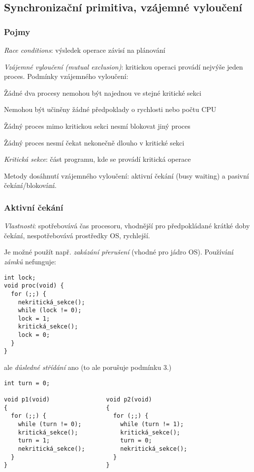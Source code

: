 \subsection{Synchronizační primitiva, vzájemné vyloučení}

\subsubsection*{Pojmy}

\emph{Race conditions}: výsledek operace závisí na plánování

\emph{Vzájemné vyloučení (mutual exclusion)}: kritickou operaci provádí nejvýše jeden proces. Podmínky vzájemného vyloučení:
\begin{penumerate}
	\item Žádné dva procesy nemohou být najednou ve stejné kritické sekci
	\item Nemohou být učiněny žádné předpoklady o rychlosti nebo počtu CPU
	\item Žádný proces mimo kritickou sekci nesmí blokovat jiný proces
	\item Žádný proces nesmí čekat nekonečně dlouho v kritické sekci
\end{penumerate}

\emph{Kritická sekce}: část programu, kde se provádí kritická operace

Metody dosáhnutí vzájemného vyloučení: aktivní čekání (busy waiting) a pasivní čekání/blokování.

\subsubsection*{Aktivní čekání}
\emph{Vlastnosti}: spotřebovává čas procesoru, vhodnější pro předpokládané krátké doby čekání, nespotřebovává prostředky OS, rychlejší.

Je možné použít např. \emph{zakázání přerušení} (vhodné pro jádro OS). Používání \emph{zámků} nefunguje:
\begin{verbatim}
int lock;
void proc(void) {
  for (;;) {
    nekritická_sekce();
    while (lock != 0);
    lock = 1;
    kritická_sekce();
    lock = 0;
  }
}
\end{verbatim}
ale \emph{důsledné střídání} ano (to ale porušuje podmínku 3.)

\begin{verbatim}
int turn = 0;

void p1(void)                void p2(void)
{                            {
  for (;;) {                   for (;;) {
    while (turn != 0);           while (turn != 1);
    kritická_sekce();            kritická_sekce();
    turn = 1;                    turn = 0;
    nekritická_sekce();          nekritická_sekce();
  }                            }
}                            }
\end{verbatim}

